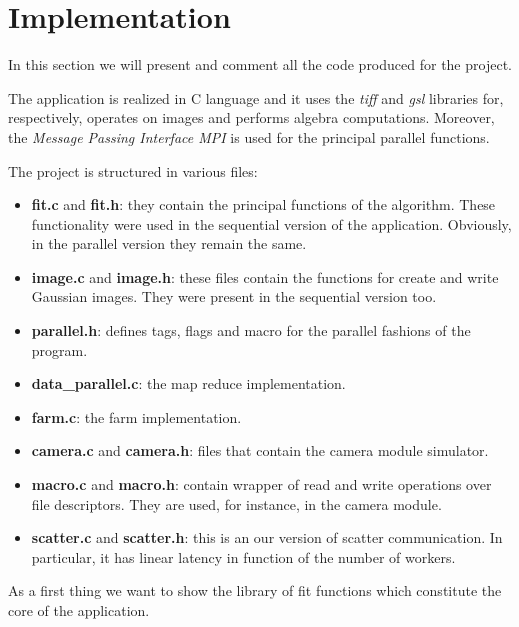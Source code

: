 \section{Implementation}

In this section we will present and comment all the code produced for the project.

The application is realized in C language and it uses the \textit{tiff} and \textit{gsl} libraries for, respectively, operates on images and performs algebra computations. Moreover, the \textit{Message Passing Interface MPI} is used for the principal parallel functions.

The project is structured in various files:
\begin{itemize}
\item \textbf{fit.c} and \textbf{fit.h}: they contain the principal functions of the algorithm. These functionality were used in the sequential version of the application. Obviously, in the parallel version they remain the same.
\item \textbf{image.c} and \textbf{image.h}: these files contain the functions for create and write Gaussian images. They were present in the sequential version too.
\item \textbf{parallel.h}: defines tags, flags and macro for the parallel fashions of the program.
\item \textbf{data\_parallel.c}: the map reduce implementation.
\item \textbf{farm.c}: the farm implementation.
\item \textbf{camera.c} and \textbf{camera.h}: files that contain the camera module simulator.
\item \textbf{macro.c} and \textbf{macro.h}: contain wrapper of read and write operations over file descriptors. They are used, for instance, in the camera module.
\item \textbf{scatter.c} and \textbf{scatter.h}: this is an our version of scatter communication. In particular, it has linear latency in function of the number of workers.
\end{itemize}

As a first thing we want to show the library of fit functions which constitute the core of the application.
\ \\



